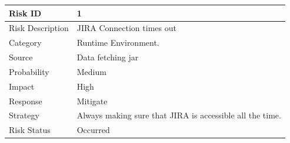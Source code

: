 \documentclass[oneside,a4paper,12pt]{book}
\begin{document}
\begin{table}[H]
 			\centering
\begin{tabular}{p{1.31in}p{4.71in}}
\hline
\multicolumn{1}{|p{1.31in}}{Risk ID} & 
\multicolumn{1}{|p{4.71in}|}{1} \\
\hline
\multicolumn{1}{|p{1.31in}}{Risk Description} & 
\multicolumn{1}{|p{4.71in}|}{JIRA Connection times out} \\
\hline
\multicolumn{1}{|p{1.31in}}{Category} & 
\multicolumn{1}{|p{4.71in}|}{Runtime Environment.} \\
\hline
\multicolumn{1}{|p{1.31in}}{Source} & 
\multicolumn{1}{|p{4.71in}|}{Data fetching jar} \\
\hline
\multicolumn{1}{|p{1.31in}}{Probability} & 
\multicolumn{1}{|p{4.71in}|}{Medium} \\
\hline
\multicolumn{1}{|p{1.31in}}{Impact} & 
\multicolumn{1}{|p{4.71in}|}{High} \\
\hline
\multicolumn{1}{|p{1.31in}}{Response} & 
\multicolumn{1}{|p{4.71in}|}{Mitigate} \\
\hline
\multicolumn{1}{|p{1.31in}}{Strategy} & 
\multicolumn{1}{|p{4.71in}|}{Always making sure that JIRA is accessible all the time.} \\
\hline
\multicolumn{1}{|p{1.31in}}{Risk Status} & 
\multicolumn{1}{|p{4.71in}|}{Occurred} \\
\hline

\end{tabular}
 \end{table}
\endgroup 
 
 \begingroup
\setlength{\tabcolsep}{5pt} %
\renewcommand{\arraystretch}{1.5} %
 
\end{document}
